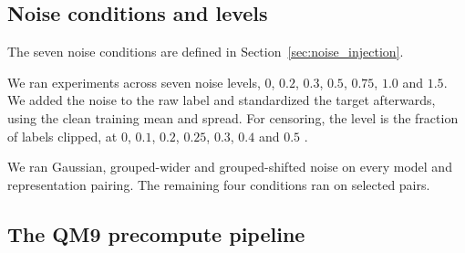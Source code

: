 \subsection{Noise conditions and levels}
The seven noise conditions are defined in Section~\ref{sec:noise_injection}.

We ran experiments across seven noise levels, $0$, $0.2$, $0.3$, $0.5$, $0.75$, $1.0$ and $1.5$. We added the noise to the raw label and standardized the target afterwards, using the clean training mean and spread. For censoring, the level is the fraction of labels clipped, at $0$, $0.1$, $0.2$, $0.25$, $0.3$, $0.4$ and $0.5$ \citep{Svensson2025}.

We ran Gaussian, grouped-wider and grouped-shifted noise on every model and representation pairing. The
remaining four conditions ran on selected pairs. 


\subsection{The QM9 precompute pipeline}

